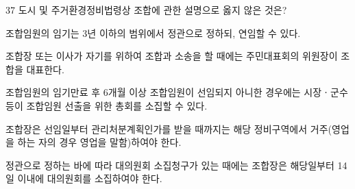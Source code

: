 \begin{question}{37}
도시 및 주거환경정비법령상 조합에 관한 설명으로 옳지 않은 것은?
\begin{choices}
  \item 조합임원의 임기는 3년 이하의 범위에서 정관으로 정하되, 연임할 수 있다.
  \item 조합장 또는 이사가 자기를 위하여 조합과 소송을 할 때에는 주민대표회의 위원장이 조합을 대표한다.
  \item 조합임원의 임기만료 후 6개월 이상 조합임원이 선임되지 아니한 경우에는 시장ㆍ군수등이 조합임원 선출을 위한 총회를 소집할 수 있다.
  \item 조합장은 선임일부터 관리처분계획인가를 받을 때까지는 해당 정비구역에서 거주(영업을 하는 자의 경우 영업을 말함)하여야 한다.
  \item 정관으로 정하는 바에 따라 대의원회 소집청구가 있는 때에는 조합장은 해당일부터 14일 이내에 대의원회를 소집하여야 한다.
\end{choices}
\end{question}

